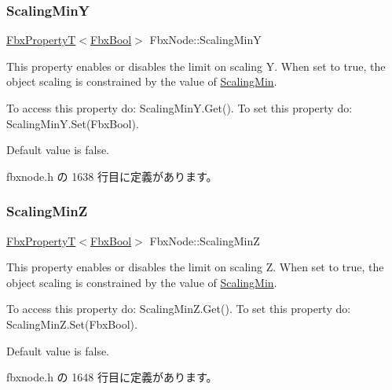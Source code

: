 \mbox{\label{class_fbx_node_ac152b4cc6a615ef0e98b802807f060da}} 
\subsubsection{\texorpdfstring{Scaling\+MinY}{ScalingMinY}}
{\footnotesize\ttfamily \hyperlink{class_fbx_property_t}{Fbx\+PropertyT}$<$\hyperlink{fbxtypes_8h_a92e0562b2fe33e76a242f498b362262e}{Fbx\+Bool}$>$ Fbx\+Node\+::\+Scaling\+MinY}

This property enables or disables the limit on scaling Y. When set to {\ttfamily true}, the object scaling is constrained by the value of \hyperlink{class_fbx_node_a90124619387dc0d2f078d4301cffb4d9}{Scaling\+Min}.

To access this property do\+: Scaling\+Min\+Y.\+Get(). To set this property do\+: Scaling\+Min\+Y.\+Set(\+Fbx\+Bool).

Default value is false. 

 fbxnode.\+h の 1638 行目に定義があります。

\mbox{\label{class_fbx_node_aba3dd61a9e6d3d553fe0a16e1027ba2b}} 
\subsubsection{\texorpdfstring{Scaling\+MinZ}{ScalingMinZ}}
{\footnotesize\ttfamily \hyperlink{class_fbx_property_t}{Fbx\+PropertyT}$<$\hyperlink{fbxtypes_8h_a92e0562b2fe33e76a242f498b362262e}{Fbx\+Bool}$>$ Fbx\+Node\+::\+Scaling\+MinZ}

This property enables or disables the limit on scaling Z. When set to {\ttfamily true}, the object scaling is constrained by the value of \hyperlink{class_fbx_node_a90124619387dc0d2f078d4301cffb4d9}{Scaling\+Min}.

To access this property do\+: Scaling\+Min\+Z.\+Get(). To set this property do\+: Scaling\+Min\+Z.\+Set(\+Fbx\+Bool).

Default value is false. 

 fbxnode.\+h の 1648 行目に定義があります。

\mbox{\label{class_fbx_node_a8f1fe91e72b9e34f981b153140cc35de}} 
